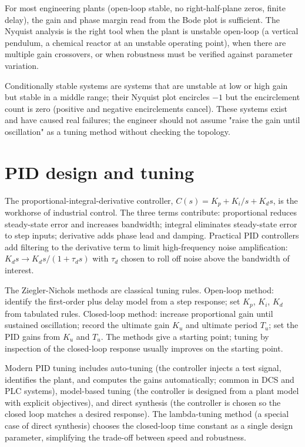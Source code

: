 For most engineering plants (open-loop stable, no right-half-plane zeros, finite delay), the gain and phase margin read from the Bode plot is sufficient. The Nyquist analysis is the right tool when the plant is unstable open-loop (a vertical pendulum, a chemical reactor at an unstable operating point), when there are multiple gain crossovers, or when robustness must be verified against parameter variation.

Conditionally stable systems are systems that are unstable at low or high gain but stable in a middle range; their Nyquist plot encircles $-1$ but the encirclement count is zero (positive and negative encirclements cancel). These systems exist and have caused real failures; the engineer should not assume "raise the gain until oscillation" as a tuning method without checking the topology.

\section{PID design and tuning}

The proportional-integral-derivative controller, $C(s) = K_p + K_i/s + K_d s$, is the workhorse of industrial control. The three terms contribute: proportional reduces steady-state error and increases bandwidth; integral eliminates steady-state error to step inputs; derivative adds phase lead and damping. Practical PID controllers add filtering to the derivative term to limit high-frequency noise amplification: $K_d s \to K_d s / (1 + \tau_d s)$ with $\tau_d$ chosen to roll off noise above the bandwidth of interest.

The Ziegler-Nichols methods are classical tuning rules. Open-loop method: identify the first-order plus delay model from a step response; set $K_p$, $K_i$, $K_d$ from tabulated rules. Closed-loop method: increase proportional gain until sustained oscillation; record the ultimate gain $K_u$ and ultimate period $T_u$; set the PID gains from $K_u$ and $T_u$. The methods give a starting point; tuning by inspection of the closed-loop response usually improves on the starting point.

Modern PID tuning includes auto-tuning (the controller injects a test signal, identifies the plant, and computes the gains automatically; common in DCS and PLC systems), model-based tuning (the controller is designed from a plant model with explicit objectives), and direct synthesis (the controller is chosen so the closed loop matches a desired response). The lambda-tuning method (a special case of direct synthesis) chooses the closed-loop time constant as a single design parameter, simplifying the trade-off between speed and robustness.

